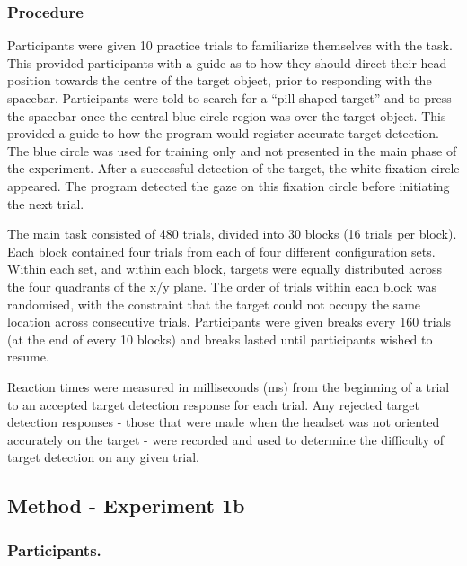 \documentclass[
  english,
  man,floatsintext]{apa7}
\begin{document}
\hypertarget{procedure}{%
\subsubsection{Procedure}\label{procedure}}

Participants were given 10 practice trials to familiarize themselves with the task. This provided participants with a guide as to how they should direct their head position towards the centre of the target object, prior to responding with the spacebar. Participants were told to search for a ``pill-shaped target'' and to press the spacebar once the central blue circle region was over the target object. This provided a guide to how the program would register accurate target detection. The blue circle was used for training only and not presented in the main phase of the experiment. After a successful detection of the target, the white fixation circle appeared. The program detected the gaze on this fixation circle before initiating the next trial.

The main task consisted of 480 trials, divided into 30 blocks (16 trials per block). Each block contained four trials from each of four different configuration sets. Within each set, and within each block, targets were equally distributed across the four quadrants of the x/y plane. The order of trials within each block was randomised, with the constraint that the target could not occupy the same location across consecutive trials. Participants were given breaks every 160 trials (at the end of every 10 blocks) and breaks lasted until participants wished to resume.

Reaction times were measured in milliseconds (ms) from the beginning of a trial to an accepted target detection response for each trial. Any rejected target detection responses - those that were made when the headset was not oriented accurately on the target - were recorded and used to determine the difficulty of target detection on any given trial.

\hypertarget{method---experiment-1b}{%
\subsection{Method - Experiment 1b}\label{method---experiment-1b}}

\hypertarget{participants.-1}{%
\subsubsection{Participants.}\label{participants.-1}}
\end{document}

